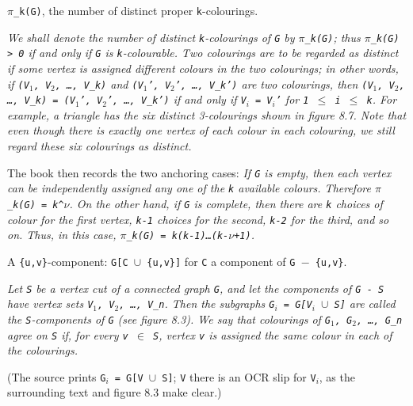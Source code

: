 \begin{definition}
\label{SimpleGraph.numColorings}
\leanok
\texttt{$\pi$\_k(G)}, the number of distinct proper \texttt{k}-colourings.

\emph{We shall denote the number of distinct
\texttt{k}-colourings of \texttt{G} by \texttt{$\pi$\_k(G)}; thus \texttt{$\pi$\_k(G) > 0} if and only if \texttt{G} is
\texttt{k}-colourable.  Two colourings are to be regarded as distinct if some vertex is
assigned different colours in the two colourings; in other words, if
\texttt{(V$_{1}$, V$_{2}$, \dots{}, V\_k)} and \texttt{(V$_{1}$', V$_{2}$', \dots{}, V\_k')} are two colourings, then
\texttt{(V$_{1}$, V$_{2}$, \dots{}, V\_k) = (V$_{1}$', V$_{2}$', \dots{}, V\_k')} if and only if \texttt{V$_{i}$ = V$_{i}$'} for
\texttt{1 $\le$ i $\le$ k}.  For example, a triangle has the six distinct 3-colourings shown in
figure 8.7.  Note that even though there is exactly one vertex of each colour in
each colouring, we still regard these six colourings as distinct.}

The book then records the two anchoring cases: \emph{If \texttt{G} is empty, then each
vertex can be independently assigned any one of the \texttt{k} available colours.
Therefore \texttt{$\pi$\_k(G) = k\textasciicircum{}$\nu$}. On the other hand, if
\texttt{G} is complete, then there are \texttt{k} choices of colour for the first
vertex, \texttt{k-1} choices for the second, \texttt{k-2} for the third, and so on.
Thus, in this case, \texttt{$\pi$\_k(G) = k(k-1)\dots{}(k-$\nu$+1)}.}
\end{definition}

\begin{definition}
\label{SimpleGraph.uvComponent}
\leanok
A \texttt{\{u,v\}}-component: \texttt{G[C $\cup$ \{u,v\}]} for \texttt{C} a component of
\texttt{G $-$ \{u,v\}}.

\emph{Let \texttt{S} be a vertex cut of a connected
graph \texttt{G}, and let the components of \texttt{G - S} have vertex sets
\texttt{V$_{1}$, V$_{2}$, \dots{}, V\_n}.
Then the subgraphs \texttt{G$_{i}$ = G[V$_{i}$ $\cup$ S]} are called the
\texttt{S}-components of \texttt{G} (see
figure 8.3). We say that colourings of \texttt{G$_{1}$, G$_{2}$, \dots{}, G\_n} agree on
\texttt{S} if, for
every \texttt{v $\in$ S}, vertex \texttt{v} is assigned the same colour in each of the
colourings.}

(The source prints \texttt{G$_{i}$ = G[V $\cup$ S]}; \texttt{V} there is an OCR slip for
\texttt{V$_{i}$}, as the
surrounding text and figure 8.3 make clear.)
\end{definition}

